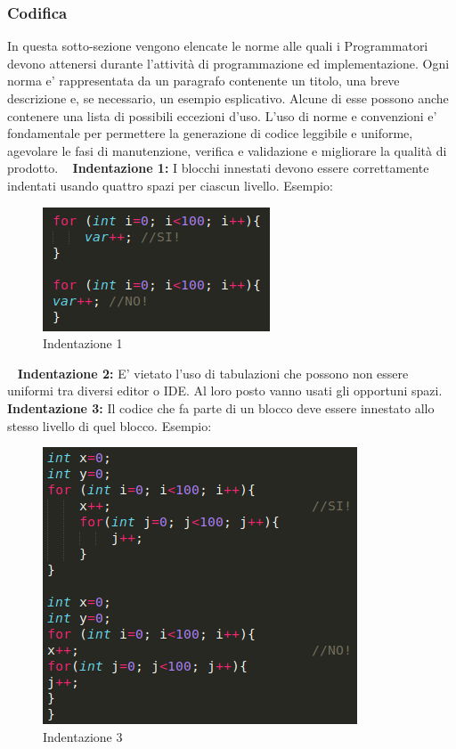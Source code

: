	    \subsubsection{Codifica}
	In  questa  sotto-sezione  vengono  elencate  le  norme   alle  quali  i  Programmatori  devono attenersi durante l’attività di programmazione ed implementazione. Ogni  norma e'  rappresentata  da  un  paragrafo contenente un titolo,  una breve descrizione e, se necessario, un esempio esplicativo.  Alcune di esse possono anche contenere una lista di possibili eccezioni d’uso. L’uso di norme e convenzioni e' fondamentale per permettere la generazione di codice leggibile e uniforme, agevolare le fasi di manutenzione,  verifica e validazione e migliorare la qualità di prodotto. \newline
~\newline	
\textbf{Indentazione 1:} I blocchi innestati devono essere correttamente indentati usando quattro spazi per ciascun livello. \newline
	Esempio:\newline
	\begin{figure}[!htbp]
		\centering
		\includegraphics{indentazione1.png}
		\caption{Indentazione 1}
	\end{figure}
~\newline	
	\textbf{Indentazione 2:} E' vietato l'uso di tabulazioni che possono non essere uniformi tra diversi editor o IDE. Al loro posto vanno usati gli opportuni spazi. \newline
~\newline	
	\textbf{Indentazione 3:} Il codice che fa parte di un blocco deve essere innestato allo stesso livello di quel blocco. \newline
	Esempio:\newline
	\begin{figure}[!htbp]
		\centering
		\includegraphics{indentazione3.png}
		\caption{Indentazione 3}
	\end{figure}
